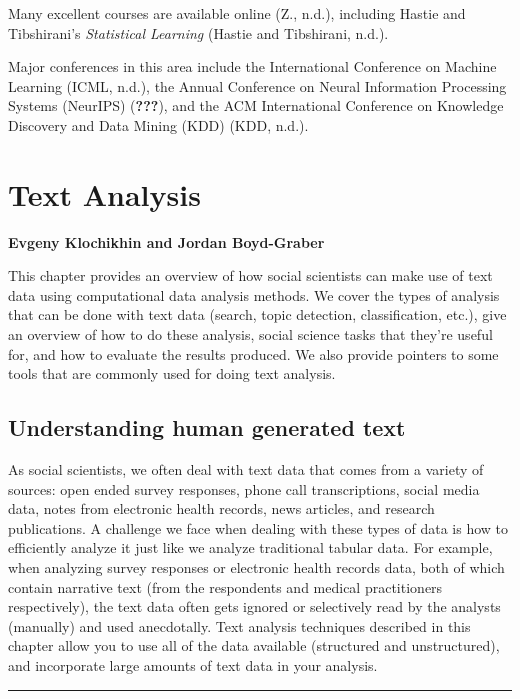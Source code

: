 \documentclass[]{krantz}
\begin{document}
Many excellent courses are available online (Z., n.d.), including Hastie
and Tibshirani's \emph{Statistical Learning} (Hastie and Tibshirani,
n.d.).

Major conferences in this area include the International Conference on
Machine Learning (ICML, n.d.), the Annual Conference on Neural
Information Processing Systems (NeurIPS) ({\textbf{???}}), and the ACM
International Conference on Knowledge Discovery and Data Mining (KDD)
(KDD, n.d.).

\hypertarget{chap:text}{\chapter{Text Analysis}\label{chap:text}}

\textbf{Evgeny Klochikhin and Jordan Boyd-Graber}

This chapter provides an overview of how social scientists can make use
of text data using computational data analysis methods. We cover the
types of analysis that can be done with text data (search, topic
detection, classification, etc.), give an overview of how to do these
analysis, social science tasks that they're useful for, and how to
evaluate the results produced. We also provide pointers to some tools
that are commonly used for doing text analysis.

\section{Understanding human generated
text}\label{understanding-human-generated-text}

As social scientists, we often deal with text data that comes from a
variety of sources: open ended survey responses, phone call
transcriptions, social media data, notes from electronic health records,
news articles, and research publications. A challenge we face when
dealing with these types of data is how to efficiently analyze it just
like we analyze traditional tabular data. For example, when analyzing
survey responses or electronic health records data, both of which
contain narrative text (from the respondents and medical practitioners
respectively), the text data often gets ignored or selectively read by
the analysts (manually) and used anecdotally. Text analysis techniques
described in this chapter allow you to use all of the data available
(structured and unstructured), and incorporate large amounts of text
data in your analysis.

\begin{center}\rule{0.5\linewidth}{\linethickness}\end{center}
\end{document}

